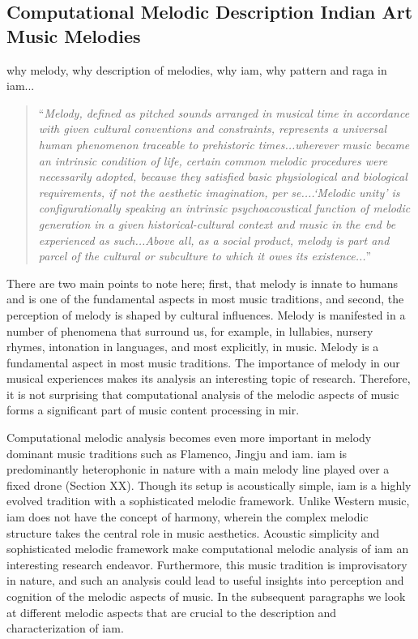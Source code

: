 \subsection{Computational Melodic Description Indian Art Music Melodies}
\label{sec:intro_melodic_analysis_IAM}

why melody, why description of melodies, why iam, why pattern and raga in iam...

\blockcquote{ringer2001melody}{``\textit{Melody, defined as pitched sounds arranged in musical time in accordance with given cultural conventions and constraints, represents a universal human phenomenon traceable to prehistoric times...wherever music became an intrinsic condition of life, certain common melodic procedures were necessarily adopted, because they satisfied basic physiological and biological requirements, if not the aesthetic imagination, per se....`Melodic unity' is configurationally speaking an intrinsic psychoacoustical function of melodic generation in a given historical-cultural context and music in the end be experienced as such...Above all, as a social product, melody is part and parcel of the cultural or subculture to which it owes its existence...}''}

There are two main points to note here; first, that melody is innate to humans and is one of the fundamental aspects in most music traditions, and second, the perception of melody is shaped by cultural influences. Melody is manifested in a number of phenomena that surround us, for example, in lullabies, nursery rhymes, intonation in languages, and most explicitly, in music. Melody is a fundamental aspect in most music traditions. The importance of melody in our musical experiences makes its analysis an interesting topic of research. Therefore, it is not surprising that computational analysis of the melodic aspects of music forms a significant part of music content processing in \gls{mir}. 

Computational melodic analysis becomes even more important in melody dominant music traditions such as Flamenco, Jingju and \gls{iam}. \gls{iam} is predominantly heterophonic in nature with a main melody line played over a fixed drone (Section XX). Though its setup is acoustically simple, \gls{iam} is a highly evolved tradition with a sophisticated melodic framework. Unlike Western music, \gls{iam} does not have the concept of harmony,  wherein the complex melodic structure takes the central role in music aesthetics. Acoustic simplicity and sophisticated melodic framework make computational melodic analysis of \gls{iam} an interesting research endeavor. Furthermore, this music tradition is improvisatory in nature, and such an analysis could lead to useful insights into perception and cognition of the melodic aspects of music. In the subsequent paragraphs we look at different melodic aspects that are crucial to the description and characterization of \gls{iam}.

